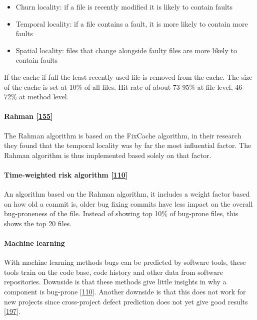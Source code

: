 \documentclass[]{book}
\providecommand{\tightlist}{%
  \setlength{\itemsep}{0pt}\setlength{\parskip}{0pt}}
\let\oldparagraph\paragraph
\renewcommand{\paragraph}[1]{\oldparagraph{#1}\mbox{}}
\begin{document}
\begin{itemize}
\tightlist
\item
  Churn locality: if a file is recently modified it is likely to contain
  faults
\item
  Temporal locality: if a file contains a fault, it is more likely to
  contain more faults
\item
  Spatial locality: files that change alongside faulty files are more
  likely to contain faults
\end{itemize}

If the cache if full the least recently used file is removed from the
cache. The size of the cache is set at 10\% of all files. Hit rate of
about 73-95\% at file level, 46-72\% at method level.

\paragraph{\texorpdfstring{Rahman
{[}\protect\hyperlink{ref-rahman2011}{155}{]}}{Rahman {[}155{]}}}\label{rahman-rahman2011}

The Rahman algorithm is based on the FixCache algorithm, in their
research they found that the temporal locality was by far the most
influential factor. The Rahman algorithm is thus implemented based
solely on that factor.

\paragraph{\texorpdfstring{Time-weighted risk algorithm
{[}\protect\hyperlink{ref-Lewis2013}{110}{]}}{Time-weighted risk algorithm {[}110{]}}}\label{time-weighted-risk-algorithm-lewis2013}

An algorithm based on the Rahman algorithm, it includes a weight factor
based on how old a commit is, older bug fixing commits have less impact
on the overall bug-proneness of the file. Instead of showing top 10\% of
bug-prone files, this shows the top 20 files.

\paragraph{Machine learning}\label{machine-learning}

With machine learning methods bugs can be predicted by software tools,
these tools train on the code base, code history and other data from
software repositories. Downside is that these methods give little
insights in why a component is bug-prone
{[}\protect\hyperlink{ref-Lewis2013}{110}{]}. Another downside is that
this does not work for new projects since cross-project defect
prediction does not yet give good results
{[}\protect\hyperlink{ref-zimmermann2009}{197}{]}.
\end{document}
